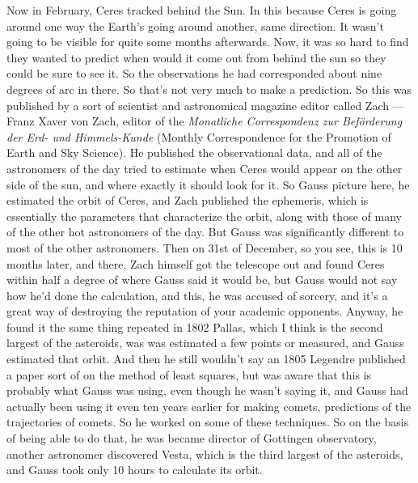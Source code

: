 \documentclass[11pt,a4paper]{article}
\begin{document}
Now in February, Ceres tracked behind the Sun. In this because Ceres is going around one way the Earth's going around another, same direction. It wasn't going to be visible for quite some months afterwards. Now, it was so hard to find they wanted to predict when would it come out from behind the sun so they could be sure to see it. So the observations he had corresponded about nine degrees of arc in there. So that's not very much to make a prediction. So this was published by a sort of scientist and astronomical magazine editor called Zach --- Franz Xaver von Zach, editor of the \textit{Monatliche Correspondenz zur Bef\"orderung der Erd- und Himmels-Kunde} (Monthly Correspondence for the Promotion of Earth and Sky Science). He published the observational data, and all of the astronomers of the day tried to estimate when Ceres would appear on the other side of the sun, and where exactly it should look for it. So Gauss picture here, he estimated the orbit of Ceres, and Zach published the ephemeris, which is essentially the parameters that characterize the orbit, along with those of many of the other hot astronomers of the day. But Gauss was significantly different to most of the other astronomers. Then on 31st of December, so you see, this is 10 months later, and there, Zach himself got the telescope out and found Ceres within half a degree of where Gauss said it would be, but Gauss would not say how he'd done the calculation, and this, he was accused of sorcery, and it's a great way of destroying the reputation of your academic opponents. Anyway, he found it the same thing repeated in 1802 Pallas, which I think is the second largest of the asteroids, was was estimated a few points or measured, and Gauss estimated that orbit. And then he still wouldn't say an 1805 Legendre published a paper sort of on the method of least squares, but was aware that this is probably what Gauss was using, even though he wasn't saying it, and Gauss had actually been using it even ten years earlier for making comets, predictions of the trajectories of comets. So he worked on some of these techniques. So on the basis of being able to do that, he was became director of Gottingen observatory, another astronomer discovered Vesta, which is the third largest of the asteroids, and Gauss took only 10 hours to calculate its orbit.
\end{document}
